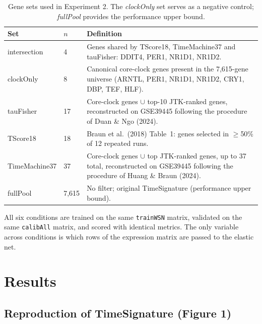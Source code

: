 \documentclass[10pt,a4paper]{article}
\begin{document}
\begin{table}[h]
\centering
\begin{tabular}{llp{7.5cm}}
\toprule
Set & $n$ & Definition \\
\midrule
intersection  &  4 & Genes shared by TScore18, TimeMachine37 and
                     tauFisher: DDIT4, PER1, NR1D1, NR1D2. \\
clockOnly     &  8 & Canonical core-clock genes present in the
                     7,615-gene universe (ARNTL, PER1, NR1D1,
                     NR1D2, CRY1, DBP, TEF, HLF). \\
tauFisher     & 17 & Core-clock genes $\cup$ top-10 JTK-ranked
                     genes, reconstructed on GSE39445 following the
                     procedure of Duan \& Ngo (2024). \\
TScore18      & 18 & Braun et al.\ (2018) Table~1: genes selected
                     in $\geq$50\% of 12 repeated runs. \\
TimeMachine37 & 37 & Core-clock genes $\cup$ top JTK-ranked genes,
                     up to 37 total, reconstructed on GSE39445
                     following the procedure of Huang \& Braun
                     (2024). \\
fullPool      & 7,615 & No filter; original TimeSignature
                        (performance upper bound). \\
\bottomrule
\end{tabular}
\caption{Gene sets used in Experiment 2.  The
\emph{clockOnly} set serves as a negative control; \emph{fullPool}
provides the performance upper bound.}
\label{tab:genesets}
\end{table}
 
All six conditions are trained on the same \texttt{trainWSN} matrix,
validated on the same \texttt{calibAll} matrix, and scored with
identical metrics.
The only variable across conditions is which rows of the expression
matrix are passed to the elastic net.

\section{Results}

\subsection{Reproduction of TimeSignature (Figure 1)}
\end{document}
